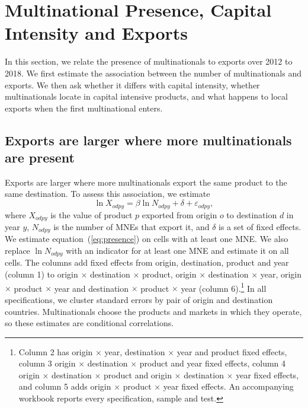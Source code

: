\documentclass[article, 12pt, 3p]{elsarticle}
\numberwithin{corollary}{proposition}
\begin{document}
\FloatBarrier
\section{Multinational Presence, Capital Intensity and Exports}\label{sec:regs}

In this section, we relate the presence of multinationals to exports over 2012 to 2018. We first estimate the
association between the number of multinationals and exports. We then ask whether it differs with capital intensity,
whether multinationals locate in capital intensive products, and what happens to local exports when the first
multinational enters.

\subsection{Exports are larger where more multinationals are present}\label{sec:base}

Exports are larger where more multinationals export the same product to the same destination. To assess this
association, we estimate
\begin{equation}\label{eq:presence}
\ln X_{odpy} = \beta \ln N_{odpy} + \delta + \varepsilon_{odpy},
\end{equation}
where $X_{odpy}$ is the value of product $p$ exported from origin $o$ to destination $d$ in year $y$, $N_{odpy}$ is the
number of MNEs that export it, and $\delta$ is a set of fixed effects. We estimate equation~(\ref{eq:presence}) on cells
with at least one MNE. We also replace $\ln N_{odpy}$ with an indicator for at least one MNE and estimate it on all cells.
The columns add fixed effects from origin, destination, product and year (column 1) to origin $\times$ destination
$\times$ product, origin $\times$ destination $\times$ year, origin $\times$ product $\times$ year and destination
$\times$ product $\times$ year (column 6).\footnote{Column 2 has origin $\times$ year, destination $\times$ year and
product fixed effects, column 3 origin $\times$ destination $\times$ product and year fixed effects, column 4 origin
$\times$ destination $\times$ product and origin $\times$ destination $\times$ year fixed effects, and column 5 adds
origin $\times$ product $\times$ year fixed effects. An accompanying workbook reports every specification, sample and
test.} In all specifications, we cluster standard errors by pair of origin and destination countries. Multinationals
choose the products and markets in which they operate, so these estimates are conditional correlations.
\end{document}
